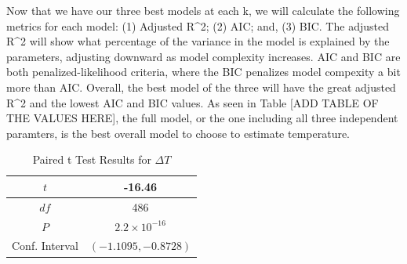 Now that we have our three best models at each k, we will calculate the following metrics for each model: (1) Adjusted R^2; (2) AIC; and, (3) BIC. The adjusted R^2 will show what percentage of the variance in the model is explained by the parameters, adjusting downward as model complexity increases. AIC and BIC are both penalized-likelihood criteria, where the BIC penalizes model compexity a bit more than AIC. Overall, the best model of the three will have the great adjusted R^2 and the lowest AIC and BIC values. As seen in Table [ADD TABLE OF THE VALUES HERE], the full model, or the one including all three independent paramters, is the best overall model to choose to estimate temperature.

\begin{table}[ht]
 \begin{centering}
 \caption{Temperature Difference Statistics}
 \label{tab:lin_regression1}
 \end{centering}
\end{table}

\begin{table}[ht]
 \begin{centering}
 \begin{tabular}{|c|c|} 
 \hline
  $t$ & -16.46 \\ 
 \hline
 $df$ & 486 \\
  \hline
 $P$ & $2.2 \times 10^{-16}$ \\ 
  \hline
 Conf. Interval & $(-1.1095, -0.8728)$ \\ 
 \hline
 \end{tabular}
 \caption{Paired t Test Results for $\Delta T$}
 \label{tab:lin_regression2}
 \end{centering}
\end{table}